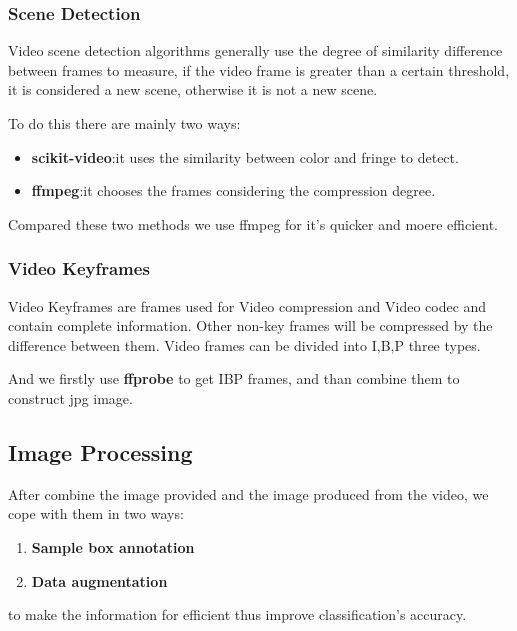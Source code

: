 \documentclass[12pt]{article}
\begin{document}
\subsubsection{Scene Detection}
Video scene detection algorithms generally use the degree of similarity difference between frames to measure, if the video frame is greater than a certain threshold, it is considered a new scene, otherwise it is not a new scene.

To do this there are mainly two ways:
\begin{itemize}
	\item \textbf{scikit-video}\cite{scikitvideo}:it uses the similarity between color and fringe to detect.
	\item \textbf{ffmpeg}\cite{ffmpeg}:it chooses the frames considering the compression degree.
\end{itemize}
Compared these two methods we use ffmpeg for it's quicker and moere efficient.

\subsubsection{Video Keyframes}
Video Keyframes are frames used for Video compression and Video codec and contain complete information. Other non-key frames will be compressed by the difference between them. Video frames can be divided into I,B,P three types.

And we firstly use \textbf{ffprobe} to get IBP frames, and than combine them to construct jpg image.



\subsection{Image Processing}
After combine the image provided and the image produced from the video, we cope with them in two ways:
\begin{enumerate}
	\item \textbf{Sample box annotation} 
	\item \textbf{Data augmentation}
\end{enumerate}
to make the information for efficient thus improve classification's accuracy.
\end{document}
